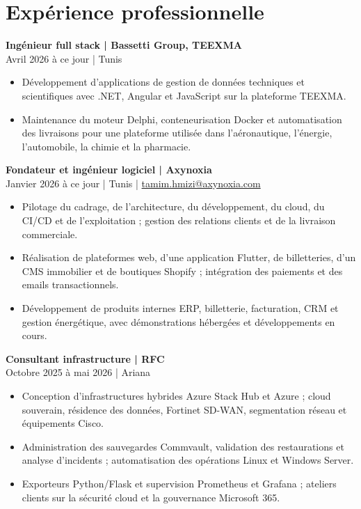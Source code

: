 \documentclass[11pt,a4paper]{article}
\newcommand{\role}[3]{\Needspace{5\baselineskip}\textbf{#1 | #2}\\#3\par}
\begin{document}
\section{Expérience professionnelle}
\role{Ingénieur full stack}{Bassetti Group, TEEXMA}{Avril 2026 à ce jour | Tunis}
\begin{itemize}
\item Développement d'applications de gestion de données techniques et scientifiques avec .NET, Angular et JavaScript sur la plateforme TEEXMA.
\item Maintenance du moteur Delphi, conteneurisation Docker et automatisation des livraisons pour une plateforme utilisée dans l’aéronautique, l’énergie, l’automobile, la chimie et la pharmacie.
\end{itemize}

\role{Fondateur et ingénieur logiciel}{Axynoxia}{Janvier 2026 à ce jour | Tunis | \href{mailto:tamim.hmizi@axynoxia.com}{tamim.hmizi@axynoxia.com}}
\begin{itemize}
\item Pilotage du cadrage, de l’architecture, du développement, du cloud, du CI/CD et de l’exploitation ; gestion des relations clients et de la livraison commerciale.
\item Réalisation de plateformes web, d'une application Flutter, de billetteries, d'un CMS immobilier et de boutiques Shopify ; intégration des paiements et des emails transactionnels.
\item Développement de produits internes ERP, billetterie, facturation, CRM et gestion énergétique, avec démonstrations hébergées et développements en cours.
\end{itemize}

\role{Consultant infrastructure}{RFC}{Octobre 2025 à mai 2026 | Ariana}
\begin{itemize}
\item Conception d'infrastructures hybrides Azure Stack Hub et Azure ; cloud souverain, résidence des données, Fortinet SD-WAN, segmentation réseau et équipements Cisco.
\item Administration des sauvegardes Commvault, validation des restaurations et analyse d'incidents ; automatisation des opérations Linux et Windows Server.
\item Exporteurs Python/Flask et supervision Prometheus et Grafana ; ateliers clients sur la sécurité cloud et la gouvernance Microsoft 365.
\end{itemize}
\end{document}

